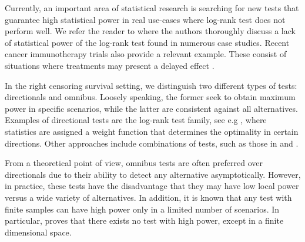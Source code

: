 \documentclass[11pt]{article}
\begin{document}
  
  
  
  
  
  
  
  Currently, an important area  of statistical  research is searching for new tests that guarantee high statistical power in real use-cases  where log-rank test does not perform well. We refer the reader  to  \cite{su2018time} where  the authors thoroughly  discuss a lack of statistical power of the log-rank test found in numerous  case studies. Recent cancer immunotherapy trials also provide a relevant example. These  consist of situations 
   where  treatments  may present a delayed effect \cite{melero2014therapeutic,xu2017designing,xu2018designing,su2018time,alexander2018hazards}.
  
  
In the right censoring survival setting, we  distinguish two  different  types of tests: directionals and  omnibus. Loosely speaking, the former seek to obtain maximum power in specific scenarios, while the latter are consistent against all alternatives. Examples of directional tests are  the log-rank test family, see e.g  \cite{gehan1965generalized,tarone1977distribution,peto1972asymptotically,fleming1981class}, where  statistics are assigned a weight function that determines the optimality in certain directions.  Other approaches include combinations of  tests, such  as those in \cite{bathke2009combined} and \cite{yang2010improved}.



From a theoretical point of view, omnibus tests are often preferred over directionals due to their ability to detect any alternative asymptotically. However, in practice, these tests have the disadvantage  that they may   have low local power  versus a wide variety of alternatives. In addition, it is known
 that any test with finite samples can have high power only in a limited number of scenarios.  In particular, \cite{janssen2000global} proves that there exists no test with high power, except in a finite dimensional space. %
 
 
\end{document}
